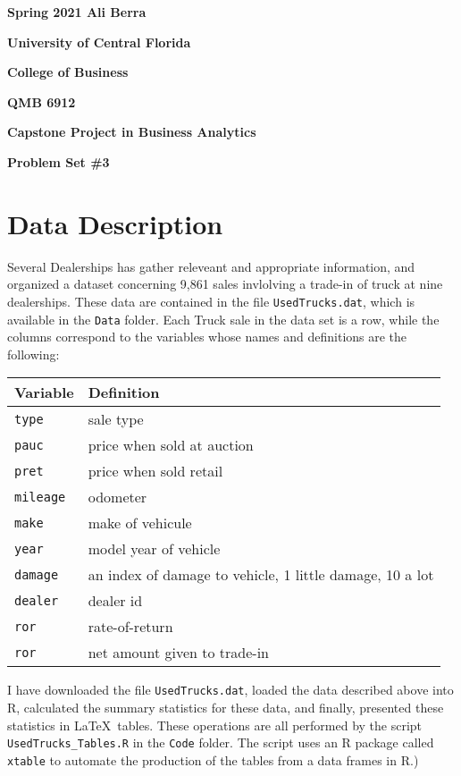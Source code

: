 \documentclass[11pt]{article}
\begin{document}

{\noindent\bf Spring 2021 \hfill Ali Berra}
\vskip 16pt
\centerline{\bf University of Central Florida}
\centerline{\bf College of Business }
\vskip 16pt
\centerline{\bf QMB 6912}
\centerline{\bf Capstone Project in Business Analytics}
\vskip 10pt
\centerline{\bf Problem Set \#3}
\vskip 32pt
\noindent
% 
\section{Data Description}
% 
Several Dealerships has gather releveant and appropriate information, and organized a dataset concerning 9,861 sales invlolving a trade-in of truck at nine dealerships.  These data are contained in the file {\tt UsedTrucks.dat}, which is
available in the {\tt Data} folder.
Each Truck sale in the data set is a row, while the columns correspond 
to the variables whose names and definitions are the following:
\bigskip
\begin{table}[ht]
\centering
\begin{tabular}{ll}
  \hline
    Variable & Definition \\
  \hline

    {\tt type}        &sale type \\ 
    {\tt pauc}       &price when sold at auction \\ 
    {\tt pret}      &price when sold retail \\ 
    {\tt mileage}    &odometer \\ 
    {\tt make}       &make of vehicule \\ 
    {\tt year}       &model year of vehicle \\ 
    {\tt damage}      &an index of damage to vehicle, 1 little damage, 10 a lot\\
    {\tt dealer}     &dealer id \\ 
    {\tt ror}    &rate-of-return \\ 
    {\tt ror}             &net amount given to trade-in \\ 
  \hline
\end{tabular}
\end{table}

\bigskip
\noindent
I have downloaded the file {\tt UsedTrucks.dat}, 
loaded the data described above into 
\textsf{R}, 
calculated the summary statistics for these data, 
and finally, presented 
these statistics in \LaTeX\ tables.
These operations are all performed by the script 
{\tt UsedTrucks\_Tables.R} in the {\tt Code} folder. 
The script uses an \textsf{R} package called {\tt xtable} 
to automate the
production of the tables from a data frames in \textsf{R}.)
\end{document}
